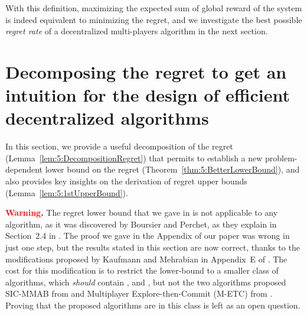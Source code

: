 With this definition, maximizing the expected sum of global reward of the system is indeed equivalent to minimizing the regret, and we investigate the best possible \emph{regret rate} of a decentralized multi-players algorithm in the next section.



\section[Decomposing the regret to get an intuition about efficient decentralized algorithms]{Decomposing the regret to get an intuition for the design of efficient decentralized algorithms}
\label{sec:5:lowerbound}

In this section, we provide a useful decomposition of the regret (Lemma~\ref{lem:5:DecompositionRegret}) that permits to establish a new problem-dependent lower bound on the regret (Theorem~\ref{thm:5:BetterLowerBound}), and also provides key insights on the derivation of regret upper bounds (Lemma~\ref{lem:5:1stUpperBound}).

\begin{leftbar}[warningbar]  %
  \textbf{\textcolor{red}{Warning}.}
  The regret lower bound that we gave in \cite{Besson2018ALT} is not applicable to any algorithm,
  as it was discovered by Boursier and Perchet, as they explain in Section~2.4 in \cite{BoursierPerchet18}.
  The proof we gave in the Appendix of our paper \cite{Besson2018ALT} was wrong in just one step,
  but the results stated in this section are now correct,
  thanks to the modifications proposed by Kaufmann and Mehrabian in Appendix~E of \cite{KaufmannAbbas19}.
  The cost for this modification is to restrict the lower-bound to a smaller class of algorithms, which \emph{should} contain \RhoRand, \RandTopM{} and \MCTopM, but not the two algorithms proposed SIC-MMAB from \cite{BoursierPerchet18} and Multiplayer Explore-then-Commit (M-ETC) from \cite{KaufmannAbbas19}.
  Proving that the proposed algorithms are in this class is left as an open question.
\end{leftbar}  %


